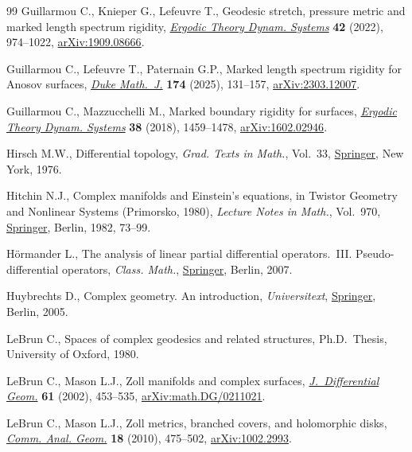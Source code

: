 \documentclass[pdftex]{sigma}
\numberwithin{equation}{section}
\theoremstyle{definition}
\newcommand{\1}{{\bf 1}}
\begin{document}
\begin{thebibliography}{99}
Guillarmou C., Knieper G., Lefeuvre T., Geodesic stretch, pressure metric and
 marked length spectrum rigidity,
 \href{https://doi.org/10.1017/etds.2021.75}{\textit{Ergodic Theory Dynam.
 Systems}} \textbf{42} (2022), 974--1022,
 \href{http://arxiv.org/abs/1909.08666}{arXiv:1909.08666}.

Guillarmou C., Lefeuvre T., Paternain G.P., Marked length spectrum rigidity for
 {A}nosov surfaces,
 \href{https://doi.org/10.1215/00127094-2024-0022}{\textit{Duke Math.~J.}}
 \textbf{174} (2025), 131--157,
 \href{http://arxiv.org/abs/2303.12007}{arXiv:2303.12007}.

Guillarmou C., Mazzucchelli M., Marked boundary rigidity for surfaces,
 \href{https://doi.org/10.1017/etds.2016.94}{\textit{Ergodic Theory Dynam.
 Systems}} \textbf{38} (2018), 1459--1478,
 \href{http://arxiv.org/abs/1602.02946}{arXiv:1602.02946}.

Hirsch M.W., Differential topology, \textit{Grad. Texts in Math.}, Vol.~33,
 \href{https://doi.org/10.1007/978-1-4684-9449-5}{Springer}, New York, 1976.

Hitchin N.J., Complex manifolds and {E}instein's equations, in Twistor
 {G}eometry and {N}onlinear {S}ystems ({P}rimorsko, 1980), \textit{Lecture
 Notes in Math.}, Vol.~970,
 \href{https://doi.org/10.1007/BFb0066025}{Springer}, Berlin, 1982, 73--99.

H\"ormander L., The analysis of linear partial differential operators.~{III}.
 Pseudo-differential operators, \textit{Class. Math.},
 \href{https://doi.org/10.1007/978-3-540-49938-1}{Springer}, Berlin, 2007.

Huybrechts D., Complex geometry. An introduction, \textit{Universitext},
 \href{https://doi.org/10.1007/b137952}{Springer}, Berlin, 2005.

LeBrun C., Spaces of complex geodesics and related structures, Ph.D.~Thesis,
 {U}niversity of Oxford, 1980.

LeBrun C., Mason L.J., Zoll manifolds and complex surfaces,
 \href{https://doi.org/10.4310/jdg/1090351530}{\textit{J.~Differential Geom.}}
 \textbf{61} (2002), 453--535,
 \href{http://arxiv.org/abs/math.DG/0211021}{arXiv:math.DG/0211021}.

LeBrun C., Mason L.J., Zoll metrics, branched covers, and holomorphic disks,
 \href{https://doi.org/10.4310/CAG.2010.v18.n3.a3}{\textit{Comm. Anal. Geom.}}
 \textbf{18} (2010), 475--502,
 \href{http://arxiv.org/abs/1002.2993}{arXiv:1002.2993}.


\end{thebibliography}
\end{document}
